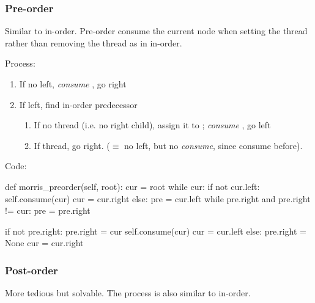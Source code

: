 \subsubsection{Pre-order}
Similar to in-order. Pre-order consume the current node when setting the thread rather than removing the thread as in in-order.

Process:
\begin{enumerate}
\item If no left, \textit{consume} , go right 
\item If left, find in-order predecessor 
\begin{enumerate}
\item If no thread (i.e. no  right child), assign it to ; \textit{consume} , go left
\item If thread, go right. ($\equiv$ no left, but no \textit{consume}, since consume before). 
\end{enumerate}
\end{enumerate}
Code:
\begin{python}
def morris_preorder(self, root):
    cur = root
    while cur:
        if not cur.left:
            self.consume(cur)
            cur = cur.right
        else:
            pre = cur.left
            while pre.right and pre.right != cur:
                pre = pre.right

            if not pre.right:
                pre.right = cur
                self.consume(cur)
                cur = cur.left
            else:
                pre.right = None
                cur = cur.right
\end{python}
\subsubsection{Post-order}
More tedious but solvable. The process is also similar to in-order.

